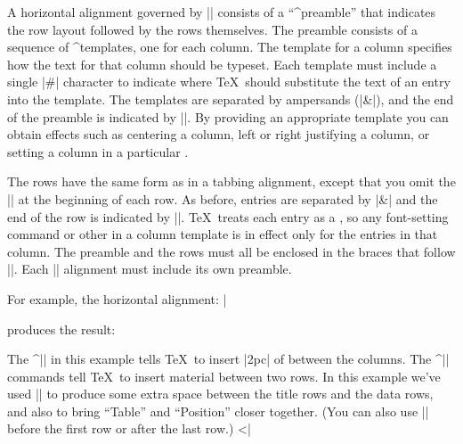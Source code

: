 A horizontal alignment governed by |\halign| consists of a
``\pix^{preamble}'' that indicates the row layout followed by the rows
themselves.
\ulist
\li The preamble consists of a sequence of \pix^{template}s, one for each
column.  The template for a column specifies how the text for that
column should be typeset.  Each template must include a single |#|
character
\ttidxref{#}
to indicate where \TeX\ should substitute the text of an entry into the
template.  The templates are separated by ampersands (|&|), \ttidxref{&}
and the end of the preamble is indicated by |\cr|.  By providing an
appropriate template you can obtain effects such as centering a column,
left or right justifying a column, or setting a column in a particular
.

\li The rows have the same form as in a tabbing alignment, except that
you omit the |\+| at the beginning of each row.
As before, entries are separated by |&| and the end of the row
is indicated by |\cr|.
\TeX\ treats each entry as a
, so any
font-setting command or other 
in a column template is in effect only for the entries in that column.
\endulist
\noindent The preamble and the rows must all be enclosed in the braces
that follow |\halign|.  Each |\halign| alignment must include
its own preamble.

For example, the horizontal alignment:
\csdisplay
\tabskip=2pc
|

\noindent produces the result:

%
\noindent The ^|\tabskip| \ctsref{\tabskip} in this example
tells \TeX\ to insert |2pc| of
 between the columns.
The ^|\noalign| \ctsref{\noalign} commands tell \TeX\ to insert
 material between two rows.
In this example we've
used |\noalign| to produce some extra space between the title rows and
the data rows, and also to bring ``Table'' and ``Position'' closer together.
(You can also use |\noalign| before the first row or after the
last row.)
\eix^^|\halign|

